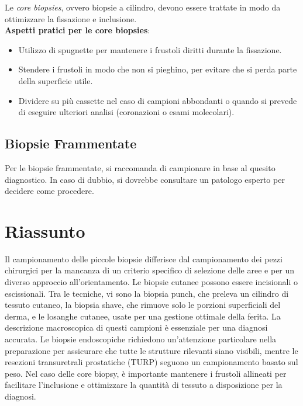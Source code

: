 Le \textit{core biopsies}, ovvero biopsie a cilindro, devono essere trattate in modo da ottimizzare la fissazione e inclusione. 
\\ \textbf{Aspetti pratici per le core biopsies}:
\begin{itemize}
    \item Utilizzo di spugnette per mantenere i frustoli diritti durante la fissazione.
    \item Stendere i frustoli in modo che non si pieghino, per evitare che si perda parte della superficie utile.
    \item Dividere su più cassette nel caso di campioni abbondanti o quando si prevede di eseguire ulteriori analisi (coronazioni o esami molecolari).
\end{itemize}

\subsection{Biopsie Frammentate}
Per le biopsie frammentate, si raccomanda di campionare in base al quesito diagnostico. In caso di dubbio, si dovrebbe consultare un patologo esperto per decidere come procedere. 

\section{Riassunto}

Il campionamento delle piccole biopsie differisce dal campionamento dei pezzi chirurgici per la mancanza di un criterio specifico di selezione delle aree e per un diverso approccio all'orientamento.  Le biopsie cutanee possono essere incisionali o escissionali. Tra le tecniche, vi sono la biopsia punch, che preleva un cilindro di tessuto cutaneo, la biopsia shave, che rimuove solo le porzioni superficiali del derma, e le losanghe cutanee, usate per una gestione ottimale della ferita. La descrizione macroscopica di questi campioni è essenziale per una diagnosi accurata. Le biopsie endoscopiche richiedono un'attenzione particolare nella preparazione per assicurare che tutte le strutture rilevanti siano visibili, mentre le resezioni transuretrali prostatiche (TURP) seguono un campionamento basato sul peso. Nel caso delle core biopsy, è importante mantenere i frustoli allineati per facilitare l'inclusione e ottimizzare la quantità di tessuto a disposizione per la diagnosi.

